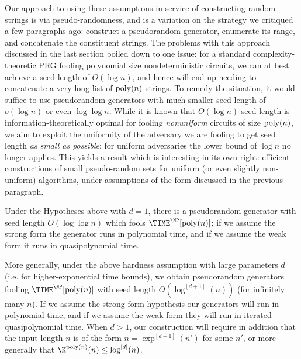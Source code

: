 Our approach to using these assumptions in service of constructing random strings is via pseudo-randomness, and is a variation on the strategy we critiqued a few paragraphs ago: construct a pseudorandom generator, enumerate its range, and concatenate the constituent strings. The problems with this approach discussed in the last section boiled down to one issue: for a standard complexity-theoretic PRG fooling polynomial size nondeterministic circuits, we can at best achieve a seed length of $O(\log n)$, and hence will end up needing to concatenate a very long list of $\mathrm{poly}(n)$ strings. To remedy the situation, it would suffice to use pseudorandom generators with much smaller seed length of $o(\log n)$ or even $\log \log n$. While it is known that $O(\log n)$ seed length is information-theoretically optimal for fooling \emph{nonuniform} circuits of size $\mathrm{poly}(n)$, we aim to exploit the uniformity of the adversary we are fooling to get seed length {\it as small as possible}; for uniform adversaries the lower bound of $\log n$ no longer applies. This yields a result which is interesting in its own right: efficient constructions of small pseudo-random sets for uniform (or even slightly non-uniform) algorithms, under assumptions of the form discussed in the previous paragraph. 




\begin{theorem}

Under the Hypotheses above with $d=1$, there is a pseudorandom generator with seed length $O(\log \log n)$ which fools $\TIME^{\NP}[\poly(n)]$; if we assume the strong form the generator runs in polynomial time, and if we assume the weak form it runs in quasipolynomial time.

More generally, under the above hardness assumption with large parameters $d$ (i.e. for higher-exponential time bounds), we obtain pseudorandom generators fooling $\TIME^{\NP}[\poly(n)]$ with seed length $O(\log^{[d+1]}(n))$ (for infinitely many $n$). If we assume the strong form hypothesis our generators will run in polynomial time, and if we assume the weak form they will run in iterated quasipolynomial time. When $d > 1$, our construction will require in addition that the input length $n$ is of the form $n = \exp^{[d-1]}(n')$ for some $n'$, or more generally that $\K^{\poly(n)}(n) \leq \log^{[d]}(n)$.
\end{theorem}

